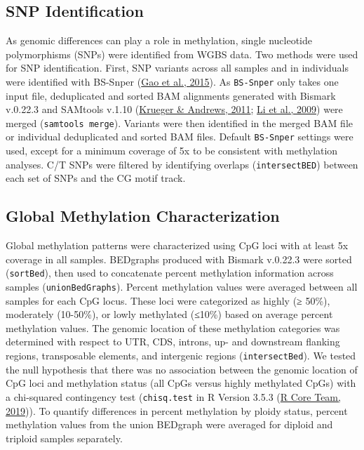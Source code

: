 \documentclass [11pt, proquest] {uwthesis}[2015/03/03]
\begin{document}
\hypertarget{snp-identification-2}{%
\subsection{SNP Identification}\label{snp-identification-2}}

As genomic differences can play a role in methylation, single nucleotide polymorphisms (SNPs) were identified from WGBS data. Two methods were used for SNP identification. First, SNP variants across all samples and in individuals were identified with BS-Snper (\protect\hyperlink{ref-Gao2015}{Gao et al., 2015}). As \texttt{BS-Snper} only takes one input file, deduplicated and sorted BAM alignments generated with Bismark v.0.22.3 and SAMtools v.1.10 (\protect\hyperlink{ref-Krueger2011}{Krueger \& Andrews, 2011}; \protect\hyperlink{ref-Li2009}{Li et al., 2009}) were merged (\texttt{samtools\ merge}). Variants were then identified in the merged BAM file or individual deduplicated and sorted BAM files. Default \texttt{BS-Snper} settings were used, except for a minimum coverage of 5x to be consistent with methylation analyses. C/T SNPs were filtered by identifying overlaps (\texttt{intersectBED}) between each set of SNPs and the CG motif track.

\hypertarget{global-methylation-characterization-1}{%
\subsection{Global Methylation Characterization}\label{global-methylation-characterization-1}}

Global methylation patterns were characterized using CpG loci with at least 5x coverage in all samples. BEDgraphs produced with Bismark v.0.22.3 were sorted (\texttt{sortBed}), then used to concatenate percent methylation information across samples (\texttt{unionBedGraphs}). Percent methylation values were averaged between all samples for each CpG locus. These loci were categorized as highly (≥ 50\%), moderately (10-50\%), or lowly methylated (≤10\%) based on average percent methylation values. The genomic location of these methylation categories was determined with respect to UTR, CDS, introns, up- and downstream flanking regions, transposable elements, and intergenic regions (\texttt{intersectBed}). We tested the null hypothesis that there was no association between the genomic location of CpG loci and methylation status (all CpGs versus highly methylated CpGs) with a chi-squared contingency test (\texttt{chisq.test} in R Version 3.5.3 (\protect\hyperlink{ref-R_Core_Team2019}{R Core Team, 2019})). To quantify differences in percent methylation by ploidy status, percent methylation values from the union BEDgraph were averaged for diploid and triploid samples separately.
\end{document}
